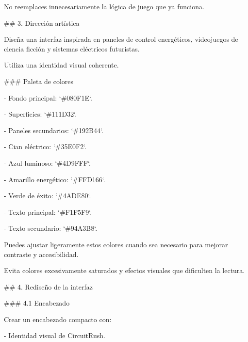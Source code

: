 \par\smallskip
\noindent No reemplaces innecesariamente la lógica de juego que ya funciona.\par
\par\smallskip
\noindent \#\# 3. Dirección artística\par
\par\smallskip
\noindent Diseña una interfaz inspirada en paneles de control energéticos, videojuegos de ciencia ficción y sistemas eléctricos futuristas.\par
\par\smallskip
\noindent Utiliza una identidad visual coherente.\par
\par\smallskip
\noindent \#\#\# Paleta de colores\par
\par\smallskip
\noindent - Fondo principal: `\#080F1E`.\par
\noindent - Superficies: `\#111D32`.\par
\noindent - Paneles secundarios: `\#192B44`.\par
\noindent - Cian eléctrico: `\#35E0F2`.\par
\noindent - Azul luminoso: `\#4D9FFF`.\par
\noindent - Amarillo energético: `\#FFD166`.\par
\noindent - Verde de éxito: `\#4ADE80`.\par
\noindent - Texto principal: `\#F1F5F9`.\par
\noindent - Texto secundario: `\#94A3B8`.\par
\par\smallskip
\noindent Puedes ajustar ligeramente estos colores cuando sea necesario para mejorar contraste y accesibilidad.\par
\par\smallskip
\noindent Evita colores excesivamente saturados y efectos visuales que dificulten la lectura.\par
\par\smallskip
\noindent \#\# 4. Rediseño de la interfaz\par
\par\smallskip
\noindent \#\#\# 4.1 Encabezado\par
\par\smallskip
\noindent Crear un encabezado compacto con:\par
\par\smallskip
\noindent - Identidad visual de CircuitRush.\par
